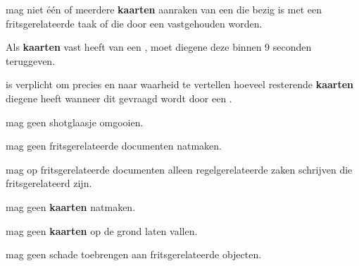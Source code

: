 \vervolgLijst{}
\item \EenSpeler mag niet \'e\'en of meerdere \textbf{kaarten} aanraken van een \medeSpeler die bezig is met een fritsgerelateerde taak of die door een \medeSpeler vastgehouden worden.
\eindLijst{}

\vervolgLijst{}
\item Als \eenSpeler \textbf{kaarten} vast heeft van een \medeSpelerN, moet diegene deze binnen 9 seconden teruggeven.
\eindLijst{}

\vervolgLijst{}
\item \EenSpeler is verplicht om precies en naar waarheid te vertellen hoeveel resterende \textbf{kaarten} diegene heeft wanneer dit gevraagd wordt door een \medeSpelerN.
\eindLijst{}


\newpage
{}
\label{sec:algemeen_einde}



\vervolgLijst{}
\item \EenSpeler mag geen shotglaasje omgooien.
\eindLijst{}

\vervolgLijst{}
\item \EenSpeler mag geen fritsgerelateerde documenten natmaken.
\eindLijst{}

\vervolgLijst{}
\item \EenSpeler mag op fritsgerelateerde documenten alleen regelgerelateerde zaken schrijven die fritsgerelateerd zijn.
\eindLijst{}

\vervolgLijst{}
\item \EenSpeler mag geen \textbf{kaarten} natmaken.
\eindLijst{}

\vervolgLijst{}
\item \EenSpeler mag geen \textbf{kaarten} op de grond laten vallen.
\eindLijst{}

\vervolgLijst{}
\item \EenSpeler mag geen schade toebrengen aan fritsgerelateerde objecten.
\eindLijst{}


